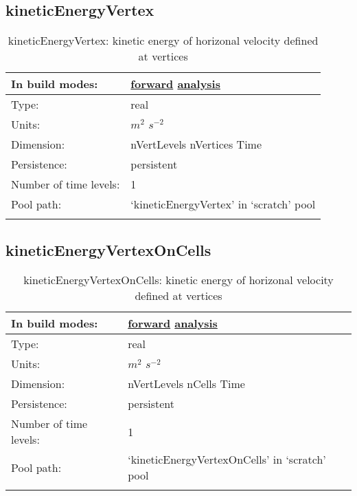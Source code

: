 \subsection[kineticEnergyVertex]{kineticEnergyVertex}
\label{subsec:var_sec_scratch_kineticEnergyVertex}
\begin{center}
\begin{longtable}{| p{2.0in} | p{4.0in} |}
        \hline 
        In build modes: & \hyperref[subsec:forward_var_tab_scratch]{forward} \hyperref[subsec:analysis_var_tab_scratch]{analysis} \\
        \hline 
        Type: & real \\
        \hline 
        Units: & $m^2$ $s^{-2}$ \\
        \hline 
        Dimension: & nVertLevels nVertices Time \\
        \hline 
        Persistence: & persistent \\
        \hline 
        Number of time levels: & 1 \\
        \hline 
            Pool path: & `kineticEnergyVertex' in `scratch' pool \\
		 \hline 
    \caption{kineticEnergyVertex: kinetic energy of horizonal velocity defined at vertices}
\end{longtable}
\end{center}
\subsection[kineticEnergyVertexOnCells]{kineticEnergyVertexOnCells}
\label{subsec:var_sec_scratch_kineticEnergyVertexOnCells}
\begin{center}
\begin{longtable}{| p{2.0in} | p{4.0in} |}
        \hline 
        In build modes: & \hyperref[subsec:forward_var_tab_scratch]{forward} \hyperref[subsec:analysis_var_tab_scratch]{analysis} \\
        \hline 
        Type: & real \\
        \hline 
        Units: & $m^2$ $s^{-2}$ \\
        \hline 
        Dimension: & nVertLevels nCells Time \\
        \hline 
        Persistence: & persistent \\
        \hline 
        Number of time levels: & 1 \\
        \hline 
            Pool path: & `kineticEnergyVertexOnCells' in `scratch' pool \\
		 \hline 
    \caption{kineticEnergyVertexOnCells: kinetic energy of horizonal velocity defined at vertices}
\end{longtable}
\end{center}

